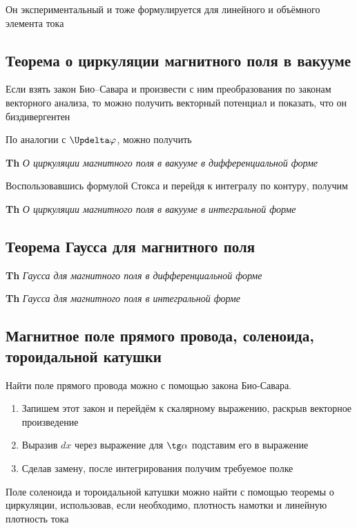 \documentclass[a4paper, 14pt]{article}
\begin{document}
    Он экспериментальный и тоже формулируется для линейного и объёмного элемента тока
    
    \subsection{Теорема о циркуляции магнитного поля в вакууме}
    
    Если взять закон Био–Савара и произвести с ним преобразования по законам векторного анализа, то можно получить
    векторный потенциал и показать, что он биздивергентен
    
    По аналогии с $\Updelta \varphi$, можно получить
    
    \textbf{Th} \textit{О циркуляции магнитного поля в вакууме в дифференциальной форме}
    
    Воспользовавшись формулой Стокса и перейдя к интегралу по контуру, получим
    
    \textbf{Th} \textit{О циркуляции магнитного поля в вакууме в интегральной форме}
    
    \subsection{Теорема Гаусса для магнитного поля}
    
    \textbf{Th} \textit{Гаусса для магнитного поля в дифференциальной форме}
    
    \textbf{Th} \textit{Гаусса для магнитного поля в интегральной форме}
    
    \subsection{Магнитное поле прямого провода, соленоида, тороидальной катушки}
    
    Найти поле прямого провода можно с помощью закона Био-Савара.
    
    \begin{enumerate}
        \item Запишем этот закон и перейдём к скалярному выражению, раскрыв векторное произведение
        \item Выразив $dx$ через выражение для $\tg \alpha$ подставим его в выражение
        \item Сделав замену, после интегрирования получим требуемое полке
    \end{enumerate}
    
    Поле соленоида и тороидальной катушки можно найти с помощью теоремы о циркуляции, использовав, если необходимо,
    плотность намотки и линейную плотность тока
    
\end{document}
